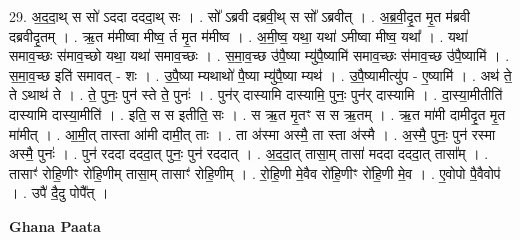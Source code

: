 \documentclass[17pt]{extarticle}
\begin{document}
29. अ॒द॒दा॒थ् स सो॑ ऽददा दददा॒थ् सः । . सो᳚ ऽब्रवी दब्रवी॒थ् स सो᳚ ऽब्रवीत् । . अ॒ब्र॒वी॒दृ॒त मृ॒त म॑ब्रवी दब्रवीदृ॒तम् । . ऋ॒त म॑मीष्वा मीष्व॒ र्त मृ॒त म॑मीष्व । . अ॒मी॒ष्व॒ यथा॒ यथा॑ ऽमीष्वा मीष्व॒ यथा᳚ । . यथा॑ समाव॒च्छः स॑माव॒च्छो यथा॒ यथा॑ समाव॒च्छः । . स॒मा॒व॒च्छ उ॑पै॒ष्या म्यु॑पै॒ष्यामि॑ समाव॒च्छः स॑माव॒च्छ उ॑पै॒ष्यामि॑ । . स॒मा॒व॒च्छ इति॑ समावत् - शः । . उ॒पै॒ष्या म्यथाथो॑ पै॒ष्या म्यु॑पै॒ष्या म्यथ॑ । . उ॒पै॒ष्यामीत्यु॑प - ए॒ष्यामि॑ । . अथ॑ ते॒ ते ऽथाथ॑ ते । . ते॒ पुनः॒ पुन॑ स्ते ते॒ पुनः॑ । . पुन॑र् दास्यामि दास्यामि॒ पुनः॒ पुन॑र् दास्यामि । . दा॒स्या॒मीतीति॑ दास्यामि दास्या॒मीति॑ । . इति॒ स स इतीति॒ सः । . स ऋ॒त मृ॒तꣳ स स ऋ॒तम् । . ऋ॒त मा॑मी दामीदृ॒त मृ॒त मा॑मीत् । . आ॒मी॒त् तास्ता आ॑मी दामी॒त् ताः । . ता अ॑स्मा अस्मै॒ ता स्ता अ॑स्मै । . अ॒स्मै॒ पुनः॒ पुन॑ रस्मा अस्मै॒ पुनः॑ । . पुन॑ रददा दददा॒त् पुनः॒ पुन॑ रददात् । . अ॒द॒दा॒त् तासा॒म् तासा॑ मददा दददा॒त् तासा᳚म् । . तासाꣳ॑ रोहि॒णीꣳ रो॑हि॒णीम् तासा॒म् तासाꣳ॑ रोहि॒णीम् । . रो॒हि॒णी मे॒वैव रो॑हि॒णीꣳ रो॑हि॒णी मे॒व । . ए॒वोपो पै॒वैवोप॑ । . उपै॑ दै॒दु पोपै᳚त् । \newline

\textbf{Ghana Paata } \newline
\end{document}
